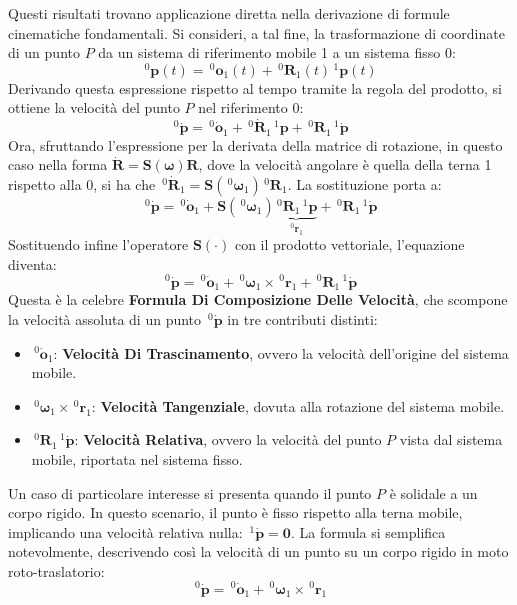 \documentclass[11pt, a4paper]{report}
\begin{document}
Questi risultati trovano applicazione diretta nella derivazione di formule cinematiche fondamentali. Si consideri, a tal fine, la trasformazione di coordinate di un punto \(P\) da un sistema di riferimento mobile 1 a un sistema fisso 0:
\[
    \,^{0}{\bm{p}}(t) = \,^{0}{\bm{o}}_1(t) + \,^{0}{\bm{R}}_1(t) \,^{1}{\bm{p}}(t)
\]
Derivando questa espressione rispetto al tempo tramite la regola del prodotto, si ottiene la velocità del punto \(P\) nel riferimento 0:
\[
    \,^{0}{\dot{\bm{p}}} = \,^{0}{\dot{\bm{o}}}_1 + \,^{0}\dot{\bm{R}}_1 \,^{1}{\bm{p}} + \,^{0}{\bm{R}}_1 \,^{1}{\dot{\bm{p}}}
\]
Ora, sfruttando l'espressione per la derivata della matrice di rotazione, in questo caso nella forma \(\dot{\bm{R}} = \bm{S}({\bm{\omega}}) \bm{R}\), dove la velocità angolare è quella della terna 1 rispetto alla 0, si ha che \(\,^{0}\dot{\bm{R}}_1 = \bm{S}(\,^{0}{\bm{\omega}}_1) \,^{0}{\bm{R}}_1\). La sostituzione porta a:
\[
    \,^{0}{\dot{\bm{p}}} = \,^{0}{\dot{\bm{o}}}_1 + \bm{S}(\,^{0}{\bm{\omega}}_1) \underbrace{\,^{0}{\bm{R}}_1 \,^{1}{\bm{p}}}_{\,^{0}{\bm{r}}_1} + \,^{0}{\bm{R}}_1 \,^{1}{\dot{\bm{p}}}
\]
Sostituendo infine l'operatore \(\bm{S}(\cdot)\) con il prodotto vettoriale, l'equazione diventa:
\[
    \,^{0}{\dot{\bm{p}}} = \,^{0}{\dot{\bm{o}}}_1 + \,^{0}{\bm{\omega}}_1 \times \,^{0}{\bm{r}}_1 + \,^{0}{\bm{R}}_1 \,^{1}{\dot{\bm{p}}}
\]
Questa è la celebre \textbf{Formula Di Composizione Delle Velocità}, che scompone la velocità assoluta di un punto \(\,^{0}{\dot{\bm{p}}}\) in tre contributi distinti:
\begin{itemize}
    \item \(\,^{0}{\dot{\bm{o}}}_1\): \textbf{Velocità Di Trascinamento}, ovvero la velocità dell'origine del sistema mobile.
    \item \(\,^{0}{\bm{\omega}}_1 \times \,^{0}{\bm{r}}_1\): \textbf{Velocità Tangenziale}, dovuta alla rotazione del sistema mobile.
    \item \(\,^{0}{\bm{R}}_1 \,^{1}{\dot{\bm{p}}}\): \textbf{Velocità Relativa}, ovvero la velocità del punto \(P\) vista dal sistema mobile, riportata nel sistema fisso.
\end{itemize}
Un caso di particolare interesse si presenta quando il punto \(P\) è solidale a un corpo rigido. In questo scenario, il punto è fisso rispetto alla terna mobile, implicando una velocità relativa nulla: \(\,^{1}{\dot{\bm{p}}} = \bm{0}\). La formula si semplifica notevolmente, descrivendo così la velocità di un punto su un corpo rigido in moto roto-traslatorio:
\[
    \,^{0}{\dot{\bm{p}}} = \,^{0}{\dot{\bm{o}}}_1 + \,^{0}{\bm{\omega}}_1 \times \,^{0}{\bm{r}}_1
\]
\end{document}
